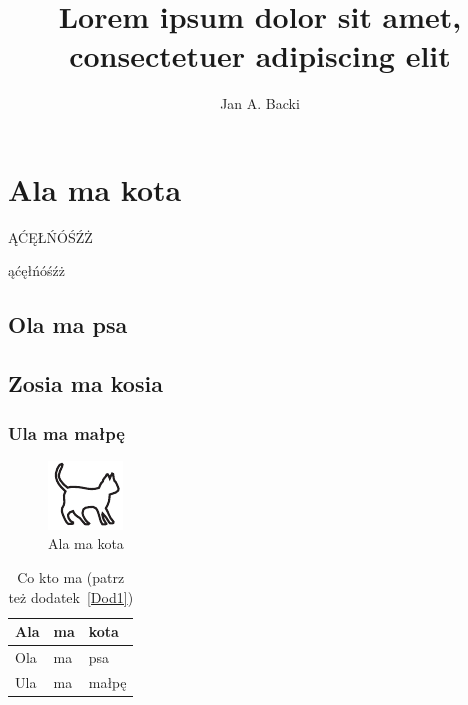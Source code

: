 \documentclass[inzynier,druk,ramka]{dyplom}
\author{Jan A. Backi}
\title{Lorem ipsum dolor sit amet, consectetuer adipiscing elit}
\begin{document}
\maketitle

\tableofcontents

\listoffigures

\listoftables





\chapter{Ala ma kota}

ĄĆĘŁŃÓŚŹŻ

ąćęłńóśźż

\lipsum[1]

\section{Ola ma psa}

\lipsum[2-3]

\section{Zosia ma kosia}

\lipsum[7]

\subsection{Ula ma małpę}

\lipsum[4-10]

\begin{figure}
\includegraphics[width=.4\textwidth]{kotek}
\caption{Ala ma kota}
\end{figure}

\lipsum[11-15]

\begin{table}
\caption{Co kto ma \cite{harel_rzecz_2008} (patrz też dodatek~\ref{Dod1})}
\begin{tabular}{|l|l|l|}
\hline
Ala & ma & kota \\
\hline
Ola & ma & psa \\
\hline
Ula & ma & małpę\\
\hline
\end{tabular}
\end{table}
\end{document}
